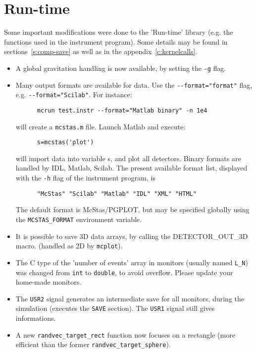 \section{Run-time} 
\label{s:new-features:run-time}

Some important modifications were done to the 'Run-time' library (e.g. the functions used in the instrument program). Some details may be found in sections~\ref{s:comp-save} as well as in the appendix~\ref{c:kernelcalls}.

\begin{itemize}
\item A global gravitation handling is now available, by setting the \verb+-g+ flag.
\item Many output formats are available for data. Use the \verb+--format="format"+
    flag, e.g. \verb+--format="Scilab"+. For instance:
    \begin{verbatim}
      mcrun test.instr --format="Matlab binary" -n 1e4
    \end{verbatim}
    will create a \verb+mcstas.m+ file. Launch Matlab and execute:
    \begin{verbatim}
      s=mcstas('plot')
    \end{verbatim}
    will import data into variable s, and plot all detectors.
    Binary formats are handled by IDL, Matlab, Scilab.
    The present available format list, displayed with
    the \verb+-h+ flag of the instrument program, is
    \begin{verbatim}
      "McStas" "Scilab" "Matlab" "IDL" "XML" "HTML" 
    \end{verbatim}
    The default format is McStas/PGPLOT, but may be specified globally using
    the \verb+MCSTAS_FORMAT+ environment variable. 
     
\item It is possible to save 3D data arrays, by calling the DETECTOR\_OUT\_3D macro.
    (handled as 2D by \verb+mcplot+). 
\item The C type of the 'number of events' array in monitors (usually named
    \verb+L_N+) was changed from \verb+int+ to \verb+double+, to avoid overflow.
    Please update your home-made monitors.
\item The \verb+USR2+ signal generates an intermediate save for all monitors, during
    the simulation (executes the \texttt{SAVE} section). The \verb+USR1+ signal still
    gives informations. 
\item A new \verb+randvec_target_rect+ function now focuses on a rectangle (more
    efficient than the former \verb+randvec_target_sphere+).
\end{itemize}


